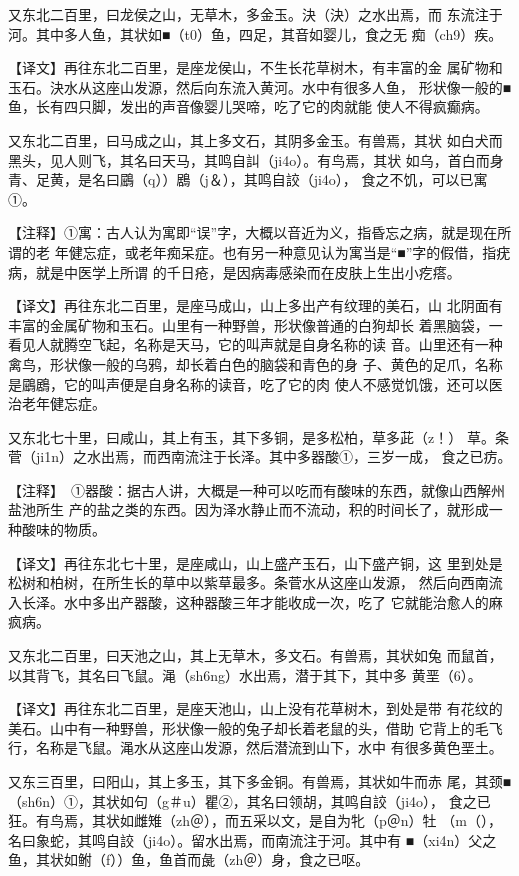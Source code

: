\documentclass[a4paper,12pt,UTF8,twoside]{ctexbook}
\begin{document}
又东北二百里，曰龙侯之山，无草木，多金玉。決（決）之水出焉，而 东流注于河。其中多人鱼，其状如■（t0）鱼，四足，其音如婴儿，食之无 痴（ch9）疾。

【译文】再往东北二百里，是座龙侯山，不生长花草树木，有丰富的金 属矿物和玉石。決水从这座山发源，然后向东流入黄河。水中有很多人鱼， 形状像一般的■鱼，长有四只脚，发出的声音像婴儿哭啼，吃了它的肉就能 使人不得疯癫病。

又东北二百里，曰马成之山，其上多文石，其阴多金玉。有兽焉，其状 如白犬而黑头，见人则飞，其名曰天马，其鸣自訆（ji4o）。有鸟焉，其状 如乌，首白而身青、足黄，是名曰鶌（q））鶋（j＆），其鸣自詨（ji4o）， 食之不饥，可以已寓①。

【注释】①寓：古人认为寓即“误”字，大概以音近为义，指昏忘之病，就是现在所谓的老 年健忘症，或老年痴呆症。也有另一种意见认为寓当是“■”字的假借，指疣病，就是中医学上所谓 的千日疮，是因病毒感染而在皮肤上生出小疙瘩。

【译文】再往东北二百里，是座马成山，山上多出产有纹理的美石，山 北阴面有丰富的金属矿物和玉石。山里有一种野兽，形状像普通的白狗却长 着黑脑袋，一看见人就腾空飞起，名称是天马，它的叫声就是自身名称的读 音。山里还有一种禽鸟，形状像一般的乌鸦，却长着白色的脑袋和青色的身 子、黄色的足爪，名称是鶌鶋，它的叫声便是自身名称的读音，吃了它的肉 使人不感觉饥饿，还可以医治老年健忘症。

又东北七十里，曰咸山，其上有玉，其下多铜，是多松柏，草多茈（z！） 草。条菅（ji1n）之水出焉，而西南流注于长泽。其中多器酸①，三岁一成， 食之已疠。

【注释】　①器酸：据古人讲，大概是一种可以吃而有酸味的东西，就像山西解州盐池所生 产的盐之类的东西。因为泽水静止而不流动，积的时间长了，就形成一种酸味的物质。

【译文】再往东北七十里，是座咸山，山上盛产玉石，山下盛产铜，这 里到处是松树和柏树，在所生长的草中以紫草最多。条菅水从这座山发源， 然后向西南流入长泽。水中多出产器酸，这种器酸三年才能收成一次，吃了 它就能治愈人的麻疯病。

又东北二百里，曰天池之山，其上无草木，多文石。有兽焉，其状如兔 而鼠首，以其背飞，其名曰飞鼠。渑（sh6ng）水出焉，潜于其下，其中多 黄垩（6）。

【译文】再往东北二百里，是座天池山，山上没有花草树木，到处是带 有花纹的美石。山中有一种野兽，形状像一般的兔子却长着老鼠的头，借助 它背上的毛飞行，名称是飞鼠。渑水从这座山发源，然后潜流到山下，水中 有很多黄色垩土。

又东三百里，曰阳山，其上多玉，其下多金铜。有兽焉，其状如牛而赤 尾，其颈■（sh6n）①，其状如句（g＃u）瞿②，其名曰领胡，其鸣自詨（ji4o）， 食之已狂。有鸟焉，其状如雌雉（zh＠），而五采以文，是自为牝（p＠n）牡 （m（），名曰象蛇，其鸣自詨（ji4o）。留水出焉，而南流注于河。其中有 ■（xi4n）父之鱼，其状如鲋（f））鱼，鱼首而彘（zh＠）身，食之已呕。
\end{document}
